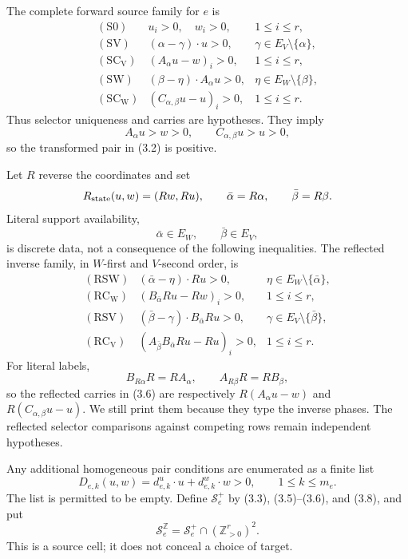 \documentclass[11pt]{article}
\theoremstyle{definition}
\theoremstyle{remark}
\begin{document}
The complete forward source family for \(e\) is
\[
\begin{array}{rll}
\mathrm{(S0)}&u_i>0,\quad w_i>0,&1\leq i\leq r,\\
\mathrm{(SV)}&(\alpha-\gamma)\cdot u>0,
 &\gamma\in E_V\setminus\{\alpha\},\\
\mathrm{(SC_V)}&(A_\alpha u-w)_i>0,&1\leq i\leq r,\\
\mathrm{(SW)}&(\beta-\eta)\cdot A_\alpha u>0,
 &\eta\in E_W\setminus\{\beta\},\\
\mathrm{(SC_W)}&(C_{\alpha,\beta}u-u)_i>0,
 &1\leq i\leq r .
\end{array}
\tag{3.3}
\]
Thus selector uniqueness and carries are hypotheses.  They imply
\[
 A_\alpha u>w>0,\qquad C_{\alpha,\beta}u>u>0,
\tag{3.4}
\]
so the transformed pair in (3.2) is positive.

Let \(R\) reverse the coordinates and set
\[
 R_{\mathrm{state}}(u,w)=(Rw,Ru),\qquad
 \bar\alpha=R\alpha,\qquad\bar\beta=R\beta .
\]
Literal support availability,
\[
 \bar\alpha\in E_W,\qquad \bar\beta\in E_V,
\tag{3.5}
\]
is discrete data, not a consequence of the following inequalities.  The
reflected inverse family, in \(W\)-first and \(V\)-second order, is
\[
\begin{array}{rll}
\mathrm{(RSW)}&(\bar\alpha-\eta)\cdot Ru>0,
 &\eta\in E_W\setminus\{\bar\alpha\},\\
\mathrm{(RC_W)}&(B_{\bar\alpha}Ru-Rw)_i>0,
 &1\leq i\leq r,\\
\mathrm{(RSV)}&(\bar\beta-\gamma)\cdot B_{\bar\alpha}Ru>0,
 &\gamma\in E_V\setminus\{\bar\beta\},\\
\mathrm{(RC_V)}&
 (A_{\bar\beta}B_{\bar\alpha}Ru-Ru)_i>0,
 &1\leq i\leq r .
\end{array}
\tag{3.6}
\]
For literal labels,
\[
 B_{R\alpha}R=RA_\alpha,\qquad A_{R\beta}R=RB_\beta,
\tag{3.7}
\]
so the reflected carries in (3.6) are respectively
\(R(A_\alpha u-w)\) and \(R(C_{\alpha,\beta}u-u)\).  We still print them
because they type the inverse phases.  The reflected selector comparisons
against competing rows remain independent hypotheses.

Any additional homogeneous pair conditions are enumerated as a finite list
\[
 D_{e,k}(u,w)=d^u_{e,k}\cdot u+d^w_{e,k}\cdot w>0,
 \qquad 1\leq k\leq m_e.
\tag{3.8}
\]
The list is permitted to be empty.  Define \(\mathcal S_e^+\) by (3.3),
(3.5)--(3.6), and (3.8), and put
\[
 \mathcal S_e^{\mathbb Z}
 =\mathcal S_e^+\cap(\mathbb Z_{>0}^{r})^2.
\tag{3.9}
\]
This is a source cell; it does not conceal a choice of target.
\end{document}
